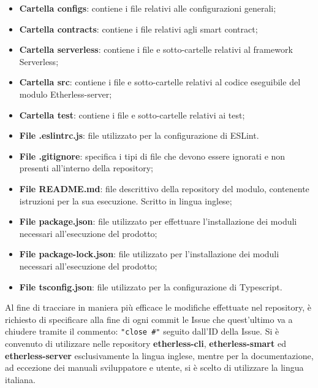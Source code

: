 			\begin{itemize}
				\item \textbf{Cartella configs}: contiene i file relativi alle configurazioni generali;
				\item \textbf{Cartella contracts}: contiene i file relativi agli smart contract;
				\item \textbf{Cartella serverless}: contiene i file e sotto-cartelle relativi al framework Serverless;
				\item \textbf{Cartella src}: contiene i file e sotto-cartelle relativi al codice eseguibile del modulo Etherless-server;
				\item \textbf{Cartella test}: contiene i file e sotto-cartelle relativi ai test;
				\item \textbf{File .eslintrc.js}: file utilizzato per la configurazione di ESLint.
				\item \textbf{File .gitignore}: specifica i tipi di file che devono essere ignorati e non presenti all'interno della repository;
				\item \textbf{File README.md}: file descrittivo della repository del modulo, contenente istruzioni per la sua esecuzione. Scritto in lingua inglese;
				\item \textbf{File package.json}: file utilizzato per effettuare l'installazione dei moduli necessari all'esecuzione del prodotto;
				\item \textbf{File package-lock.json}: file utilizzato per l'installazione dei moduli necessari all'esecuzione del prodotto;
				\item \textbf{File tsconfig.json}: file utilizzato per la configurazione di Typescript.
			\end{itemize}
			Al fine di tracciare in maniera più efficace le modifiche effettuate nel repository, è richiesto di specificare alla fine di ogni commit le Issue che quest'ultimo va a chiudere tramite il commento: \texttt{"close \#"} seguito dall'ID della Issue. Si è convenuto di utilizzare nelle repository \textbf{etherless-cli}, \textbf{etherless-smart} ed \textbf{etherless-server} esclusivamente la lingua inglese, mentre per la documentazione, ad eccezione dei manuali sviluppatore e utente, si è scelto di utilizzare la lingua italiana.

